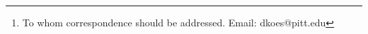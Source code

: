 
\author{%
Jocelyn Sunseri\,$^{1}$,
and David Ryan Koes\,$^{1}$%
\footnote{To whom correspondence should be addressed.
 Email: dkoes@pitt.edu}}

\address{%
$^{1}$Department of Computational and Systems Biology, University of Pittsburgh, 3501 Fifth Avenue, Pittsburgh, PA, 15260}

